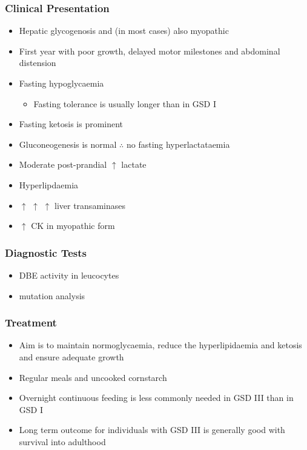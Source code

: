 \documentclass{scrartcl}
\begin{document}
\subsubsection{Clinical Presentation}
\label{sec:orgc0a76a6}
\begin{itemize}
\item Hepatic glycogenosis and (in most cases) also myopathic
\item First year with poor growth, delayed motor milestones and abdominal
distension
\item Fasting hypoglycaemia 
\begin{itemize}
\item Fasting tolerance is usually longer than in GSD I
\end{itemize}
\item Fasting ketosis is prominent
\item Gluconeogenesis is normal \(\therefore\) no fasting hyperlactataemia
\item Moderate post-prandial \(\uparrow\) lactate
\item Hyperlipdaemia
\item \(\uparrow\) \(\uparrow\) \(\uparrow\) liver transaminases
\item \(\uparrow\) CK in myopathic form
\end{itemize}
\subsubsection{Diagnostic Tests}
\label{sec:orge7c1999}
\begin{itemize}
\item DBE activity in leucocytes
\item mutation analysis
\end{itemize}
\subsubsection{Treatment}
\label{sec:org2f14f47}
\begin{itemize}
\item Aim is to maintain normoglycaemia, reduce the hyperlipidaemia and ketosis and
ensure adequate growth
\item Regular meals and uncooked cornstarch
\item Overnight continuous feeding is less commonly needed in GSD III than
in GSD I
\item Long term outcome for individuals with GSD III is generally good
with survival into adulthood
\end{itemize}
\end{document}
